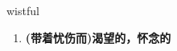 
\begin{frame}
{\huge wistful}
\begin{center}
\begin{enumerate}\Large
  \item \textbf{(带着忧伤而)渴望的，怀念的}
\end{enumerate}
\end{center}
\end{frame}
